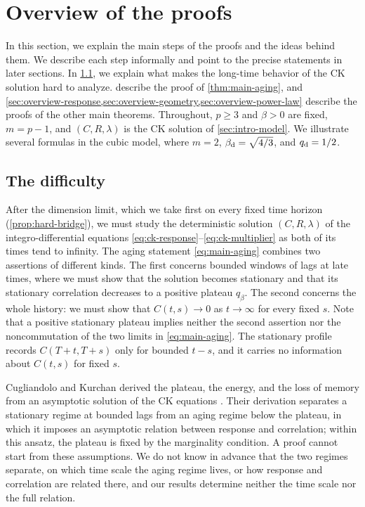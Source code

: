 \chapter{Overview of the proofs}\label{sec:proof-overview}

In this section, we explain the main steps of the proofs and the ideas behind them. We describe each step informally and point to the precise statements in later sections. In \cref{sec:overview-difficulty}, we explain what makes the long-time behavior of the CK solution hard to analyze.  describe the proof of \cref{thm:main-aging}, and \cref{sec:overview-response,sec:overview-geometry,sec:overview-power-law} describe the proofs of the other main theorems. Throughout, $p\ge3$ and $\beta>0$ are fixed, $m=p-1$, and $(C,R,\lambda)$ is the CK solution of \cref{sec:intro-model}. We illustrate several formulas in the cubic model, where $m=2$, $\beta_{\mathrm d}=\sqrt{4/3}$, and $q_{\mathrm d}=1/2$.

\section{The difficulty}\label{sec:overview-difficulty}

After the dimension limit, which we take first on every fixed time horizon (\cref{prop:hard-bridge}), we must study the deterministic solution $(C,R,\lambda)$ of the integro-differential equations \eqref{eq:ck-response}--\eqref{eq:ck-multiplier} as both of its times tend to infinity. The aging statement \eqref{eq:main-aging} combines two assertions of different kinds. The first concerns bounded windows of lags at late times, where we must show that the solution becomes stationary and that its stationary correlation decreases to a positive plateau $q_\beta$. The second concerns the whole history: we must show that $C(t,s)\to0$ as $t\to\infty$ for every fixed $s$. Note that a positive stationary plateau implies neither the second assertion nor the noncommutation of the two limits in \eqref{eq:main-aging}. The stationary profile records $C(T+t,T+s)$ only for bounded $t-s$, and it carries no information about $C(t,s)$ for fixed $s$.

Cugliandolo and Kurchan derived the plateau, the energy, and the loss of memory from an asymptotic solution of the CK equations \cite{ck1993}. Their derivation separates a stationary regime at bounded lags from an aging regime below the plateau, in which it imposes an asymptotic relation between response and correlation; within this ansatz, the plateau is fixed by the marginality condition. A proof cannot start from these assumptions. We do not know in advance that the two regimes separate, on which time scale the aging regime lives, or how response and correlation are related there, and our results determine neither the time scale nor the full relation.

